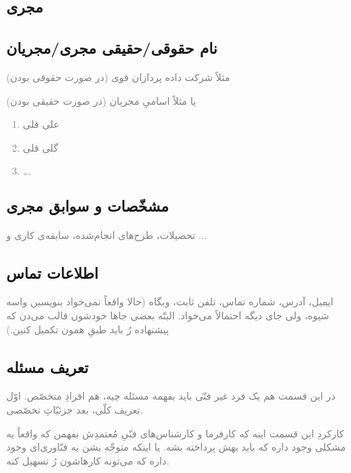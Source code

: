 \documentclass{article}
\begin{document}
\begin{framed}
	\section{مجری}
	\subsection{نام حقوقی/حقیقی مجری/مجریان}
	\textcolor{gray}{مثلاً شرکت داده پردازان قوی (در صورت حقوقی بودن)}

	\textcolor{gray}{یا مثلاً اسامیِ مجریان (در صورت حقیقی بودن)}
	\textcolor{gray}{
	\begin{enumerate}
		\item \textcolor{gray}{علی قلی}
		\item \textcolor{gray}{گلی قلی}
		\item \textcolor{gray}{$\ldots$}
	\end{enumerate}}
	\subsection{مشخّصات و سوابق مجری}
	\textcolor{gray}{تحصیلات، طرح‌های انجام‌شده، سابقه‌ی کاری و ...}
	\subsection{اطلاعات تماس}
	\textcolor{gray}{ایمیل، آدرس، شماره تماس، تلفن ثابت، وبگاه (حالا واقعاً نمی‌خواد بنویسین واسه شیوه، ولی جای دیگه احتمالاً می‌خواد. البتّه بعضی جاها خودشون قالب می‌دن که پیشنهاده رُ باید طبقِ همون تکمیل کنین.)}
\end{framed}
\begin{framed}
	\section{تعریف مسئله}
	\label{sec:definition}
	\textcolor{gray}{در این قسمت هم یک فرد غیر فنّی باید بفهمه مسئله چیه، هم افرادِ متخصّص. اوّل تعریف کلّی، بعد جزئیّاتِ تخصّصی.}

	\textcolor{gray}{کارکردِ این قسمت اینه که کارفرما و کارشناس‌های فنّیِ مُعتمدِش بفهمن که واقعاً یه مشکلی وجود داره که باید بهش پرداخته بشه. یا اینکه متوجّه بشن یه فنّاوری‌ای وجود داره که می‌تونه کارهاشون رُ تسهیل کنه.}

\end{framed}
\end{document}
